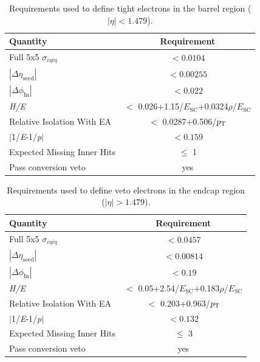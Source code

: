 \begin{table}[htbp]
\centering
\def\arraystretch{1.2}
\begin{tabular}{|l|c|}
    \hline\hline
    Quantity & Requirement \\\hline
    Full 5x5 $\sigma_{i\eta i\eta}$ &  $< 0.0104$ \\
    $|\Delta\eta_{\mathrm{seed}}|$ & $< 0.00255$  \\
    $|\Delta\phi_{\mathrm{In}}|$ & $< 0.022$ \\
    \textit{H/E} & $<$ 0.026+1.15/$E_{\mathrm{SC}}$+0.0324$\rho$/$E_{\mathrm{SC}}$ \\
    Relative Isolation With EA & $<$ 0.0287+0.506/$p_{\textrm{T}}$ \\
    $|$1/\textit{E}-1/\textit{p}$|$ & $< 0.159$ \\
    Expected Missing Inner Hits & $\leq$ 1 \\
    Pass conversion veto & yes \\
    \hline\hline
\end{tabular}
\caption{Requirements used to define tight electrons in the barrel region ($|\eta| < 1.479$).}
\label{tab:tight_electron_def_barrel}
\end{table}

\begin{table}[htbp]
\centering
\def\arraystretch{1.2}
\begin{tabular}{|l|c|}
    \hline\hline
    Quantity & Requirement \\\hline
    Full 5x5 $\sigma_{i\eta i\eta}$ &  $< 0.0457$ \\
    $|\Delta\eta_{\mathrm{seed}}|$ & $< 0.00814$  \\
    $|\Delta\phi_{\mathrm{In}}|$ & $< 0.19$ \\
    \textit{H/E} & $<$ 0.05+2.54/$E_{\mathrm{SC}}$+0.183$\rho$/$E_{\mathrm{SC}}$ \\
    Relative Isolation With EA & $<$ 0.203+0.963/$p_{\textrm{T}}$ \\
    $|$1/\textit{E}-1/\textit{p}$|$ & $< 0.132$ \\
    Expected Missing Inner Hits & $\leq$ 3 \\
    Pass conversion veto & yes \\
    \hline\hline
\end{tabular}
\caption{Requirements used to define veto electrons in the endcap region ($|\eta| > 1.479$).}
\label{tab:veto_electron_def_endcap}
\end{table}

